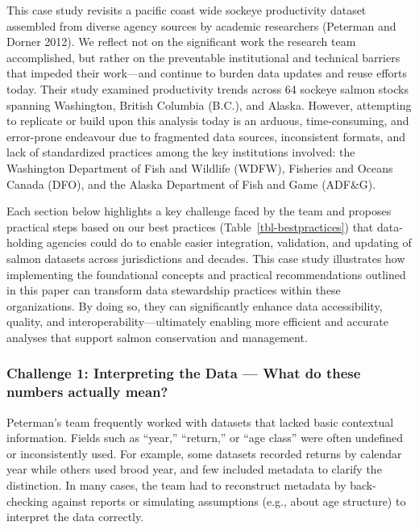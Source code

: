 \documentclass[
  letterpaper,
  DIV=11,
  numbers=noendperiod]{scrartcl}
\begin{document}
This case study revisits a pacific coast wide sockeye productivity
dataset assembled from diverse agency sources by academic researchers
(Peterman and Dorner 2012). We reflect not on the significant work the
research team accomplished, but rather on the preventable institutional
and technical barriers that impeded their work---and continue to burden
data updates and reuse efforts today. Their study examined productivity
trends across 64 sockeye salmon stocks spanning Washington, British
Columbia (B.C.), and Alaska. However, attempting to replicate or build
upon this analysis today is an arduous, time-consuming, and error-prone
endeavour due to fragmented data sources, inconsistent formats, and lack
of standardized practices among the key institutions involved: the
Washington Department of Fish and Wildlife (WDFW), Fisheries and Oceans
Canada (DFO), and the Alaska Department of Fish and Game (ADF\&G).

Each section below highlights a key challenge faced by the team and
proposes practical steps based on our best practices
(Table~\ref{tbl-bestpractices}) that data-holding agencies could do to
enable easier integration, validation, and updating of salmon datasets
across jurisdictions and decades. This case study illustrates how
implementing the foundational concepts and practical recommendations
outlined in this paper can transform data stewardship practices within
these organizations. By doing so, they can significantly enhance data
accessibility, quality, and interoperability---ultimately enabling more
efficient and accurate analyses that support salmon conservation and
management.

\subsubsection{Challenge 1: Interpreting the Data --- What do these
numbers actually
mean?}\label{challenge-1-interpreting-the-data-what-do-these-numbers-actually-mean}

Peterman's team frequently worked with datasets that lacked basic
contextual information. Fields such as ``year,'' ``return,'' or ``age
class'' were often undefined or inconsistently used. For example, some
datasets recorded returns by calendar year while others used brood year,
and few included metadata to clarify the distinction. In many cases, the
team had to reconstruct metadata by back-checking against reports or
simulating assumptions (e.g., about age structure) to interpret the data
correctly.
\end{document}
